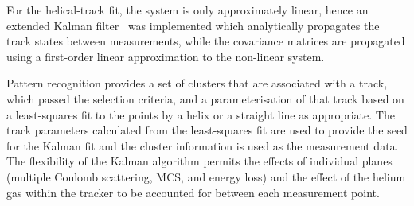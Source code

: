    For the helical-track fit, the system is only approximately linear, hence an extended Kalman filter~\cite{Goodwin} was implemented which analytically propagates the track states between measurements, while the covariance matrices are propagated using a first-order linear approximation to the non-linear system.

   Pattern recognition provides a set of clusters that are associated with a track, which passed the selection criteria, and a parameterisation of that track based on a least-squares fit to the points by a helix or a straight line as appropriate. The track parameters calculated from the least-squares fit are used to provide the seed for the Kalman fit and the cluster information is used as the measurement data. The flexibility of the Kalman algorithm permits the effects of individual planes (multiple Coulomb scattering, MCS, and energy loss) and the effect of the helium gas within the tracker to be accounted for between each measurement point.
% 
%      
